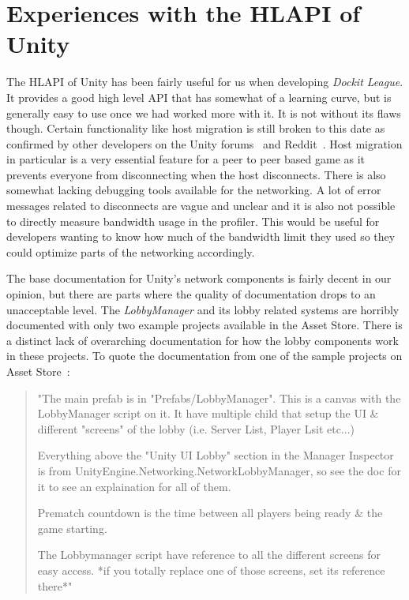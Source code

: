 \section{Experiences with the HLAPI of Unity}
The HLAPI of Unity has been fairly useful for us when developing \emph{Dockit League}. It provides a good high level API that has somewhat of a learning curve, but is generally easy to use once we had worked more with it. It is not without its flaws though. Certain functionality like host migration is still broken to this date as confirmed by other developers on the Unity forums~\cite{forumsUnityNetworkFeedback} and Reddit~\cite{redditUnityNetwork}. Host migration in particular is a very essential feature for a peer to peer based game as it prevents everyone from disconnecting when the host disconnects. There is also somewhat lacking debugging tools available for the networking. A lot of error messages related to disconnects are vague and unclear and it is also not possible to directly measure bandwidth usage in the profiler. This would be useful for developers wanting to know how much of the bandwidth limit they used so they could optimize parts of the networking accordingly. 

The base documentation for Unity's network components is fairly decent in our opinion, but there are parts where the quality of documentation drops to an unacceptable level. The \emph{LobbyManager} and its lobby related systems are horribly documented with only two example projects available in the Asset Store. There is a distinct lack of overarching documentation for how the lobby components work in these projects. To quote the documentation from one of the sample projects on Asset Store~\cite{unityAssetLobby}: 
\begin{quote}
"The main prefab is in "Prefabs/LobbyManager". This is a canvas with the LobbyManager script on it.
It have multiple child that setup the UI \& different "screens" of the lobby (i.e. Server List, Player Lsit etc...)

Everything above the "Unity UI Lobby" section in the Manager Inspector is from UnityEngine.Networking.NetworkLobbyManager, so see the doc
for it to see an explaination for all of them.

Prematch countdown is the time between all players being ready \& the game starting.

The Lobbymanager script have reference to all the different screens for easy access.
*if you totally replace one of those screens, set its reference there*"
\end{quote}

